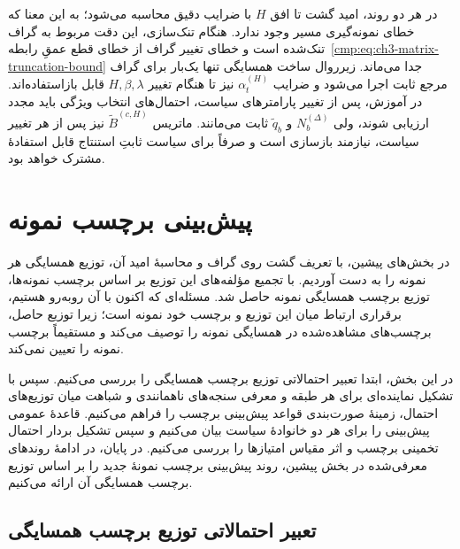 در هر دو روند، امید گشت تا افق
$H$ با ضرایب دقیق محاسبه می‌شود؛
به این معنا که خطای نمونه‌گیری
مسیر وجود ندارد. هنگام
تنک‌سازی، این دقت مربوط به
گراف تنک‌شده است و خطای تغییر
گراف از خطای قطع عمقِ
رابطه~\eqref{cmp:eq:ch3-matrix-truncation-bound}
جدا می‌ماند. زیرروال ساخت
همسایگی تنها یک‌بار برای گراف
مرجع ثابت اجرا می‌شود و ضرایب
$\alpha_t^{(H)}$ نیز تا هنگام
تغییر $H,\beta,\lambda$ قابل
بازاستفاده‌اند. در آموزش،
پس از تغییر پارامترهای سیاست،
احتمال‌های انتخاب ویژگی باید
مجدد ارزیابی شوند، ولی
$N_b^{(\Delta)}$ و
$\widetilde q_b$ ثابت می‌مانند.
ماتریس $\widetilde B^{(c,H)}$
نیز پس از هر تغییر سیاست،
نیازمند بازسازی است و صرفاً
برای سیاست ثابتِ استنتاج
قابل استفادهٔ مشترک خواهد بود.

\section{پیش‌بینی برچسب نمونه}
\label{cmp:sec:ch3-neighborhood-to-label-prediction}
در بخش‌های پیشین، با تعریف گشت روی گراف و محاسبهٔ امید آن، توزیع همسایگی هر نمونه را به دست آوردیم. با تجمیع مؤلفه‌های این توزیع بر اساس برچسب نمونه‌ها، توزیع برچسب همسایگی نمونه حاصل شد. مسئله‌ای که اکنون با آن روبه‌رو هستیم، برقراری ارتباط میان این توزیع و برچسب خود نمونه است؛ زیرا توزیع حاصل، برچسب‌های مشاهده‌شده در همسایگی نمونه را توصیف می‌کند و مستقیماً برچسب نمونه را تعیین نمی‌کند.

در این بخش، ابتدا تعبیر احتمالاتی توزیع برچسب همسایگی را بررسی می‌کنیم. سپس با تشکیل نماینده‌ای برای هر طبقه و معرفی سنجه‌های ناهمانندی و شباهت میان توزیع‌های احتمال، زمینهٔ صورت‌بندی قواعد پیش‌بینی برچسب را فراهم می‌کنیم. قاعدهٔ عمومی پیش‌بینی را برای هر دو خانوادهٔ سیاست بیان می‌کنیم و سپس تشکیل بردار احتمال تخمینی برچسب و اثر مقیاس امتیازها را بررسی می‌کنیم. در پایان، در ادامهٔ روندهای معرفی‌شده در بخش پیشین، روند پیش‌بینی برچسب نمونهٔ جدید را بر اساس توزیع برچسب همسایگی آن ارائه می‌کنیم.

\subsection{تعبیر احتمالاتی توزیع برچسب همسایگی}
\label{cmp:subsec:ch3-label-neighborhood-interpretation}

